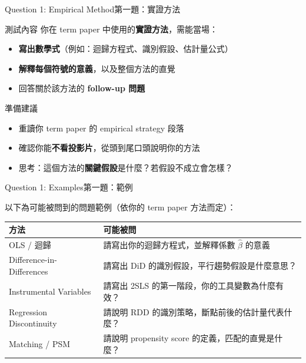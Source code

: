 \documentclass[dvipsnames,hyperref={pdfpagelabels=false}]{beamer}
\begin{document}
\begin{frame}{Question 1: Empirical Method}{第一題：實證方法}

\begin{block}{測試內容}
	你在 term paper 中使用的\textbf{實證方法}，需能當場：
	\begin{itemize}
		\vspace{0.1cm}
		\item \textbf{寫出數學式}（例如：迴歸方程式、識別假設、估計量公式）
		\vspace{0.1cm}
		\item \textbf{解釋每個符號的意義}，以及整個方法的直覺
		\vspace{0.1cm}
		\item 回答關於該方法的 \textbf{follow-up 問題}
	\end{itemize}
\end{block}

\vspace{0.3cm}

\begin{exampleblock}{準備建議}
	\begin{itemize}
		\item 重讀你 term paper 的 empirical strategy 段落
		\vspace{0.1cm}
		\item 確認你能\textbf{不看投影片}，從頭到尾口頭說明你的方法
		\vspace{0.1cm}
		\item 思考：這個方法的\textbf{關鍵假設}是什麼？若假設不成立會怎樣？
	\end{itemize}
\end{exampleblock}

\end{frame}


\begin{frame}{Question 1: Examples}{第一題：範例}

\vspace{0.1cm}
\small
以下為可能被問到的問題範例（依你的 term paper 方法而定）：

\vspace{0.3cm}
\begin{tabular}{p{} p{}}
\toprule
\textbf{方法} & \textbf{可能被問} \\
\midrule
OLS / 迴歸 &
請寫出你的迴歸方程式，並解釋係數 $\hat{\beta}$ 的意義 \\[6pt]
Difference-in-Differences &
請寫出 DiD 的識別假設，平行趨勢假設是什麼意思？ \\[6pt]
Instrumental Variables &
請寫出 2SLS 的第一階段，你的工具變數為什麼有效？ \\[6pt]
Regression Discontinuity &
請說明 RDD 的識別策略，斷點前後的估計量代表什麼？ \\[6pt]
Matching / PSM &
請說明 propensity score 的定義，匹配的直覺是什麼？ \\
\bottomrule
\end{tabular}

\end{frame}
\end{document}
